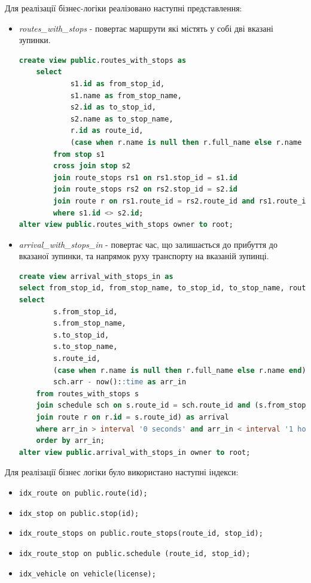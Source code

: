 \documentclass[oneside,14pt]{extarticle}
\begin{document}
Для реалізації бізнес-логіки реалізовано наступні представлення:
\begin{itemize}
\item \textit{routes\_with\_stops} - повертає маршрути які містять у собі дві вказані зупинки.
{\fontsize{8pt}{8pt}\selectfont\begin{lstlisting}[language=sql]
create view public.routes_with_stops as
	select
			s1.id as from_stop_id,
			s1.name as from_stop_name,
			s2.id as to_stop_id,
			s2.name as to_stop_name,
			r.id as route_id,
			(case when r.name is null then r.full_name else r.name end) as route_name
		from stop s1
		cross join stop s2
		join route_stops rs1 on rs1.stop_id = s1.id
		join route_stops rs2 on rs2.stop_id = s2.id
		join route r on rs1.route_id = rs2.route_id and rs1.route_id = r.id
		where s1.id <> s2.id;
alter view public.routes_with_stops owner to root;
\end{lstlisting}}
\item \textit{arrival\_with\_stops\_in} - повертає час, що залишається до прибуття до вказаної зупинки, та напрямок руху транспорту на вказаній зупинці.
{\fontsize{8pt}{8pt}\selectfont\begin{lstlisting}[language=sql]
create view arrival_with_stops_in as
select from_stop_id, from_stop_name, to_stop_id, to_stop_name, route_id, route_name, to_char(arr_in, 'MI:SS') as arr_in from (
select
		s.from_stop_id,
		s.from_stop_name,
		s.to_stop_id,
		s.to_stop_name,
		s.route_id,
		(case when r.name is null then r.full_name else r.name end) as route_name,
		sch.arr - now()::time as arr_in
	from routes_with_stops s
	join schedule sch on s.route_id = sch.route_id and (s.from_stop_id = sch.stop_id or s.to_stop_id = sch.stop_id)
	join route r on r.id = s.route_id) as arrival
	where arr_in > interval '0 seconds' and arr_in < interval '1 hour'
	order by arr_in;
alter view public.arrival_with_stops_in owner to root;
\end{lstlisting}}
\end{itemize}

Для реалізації бізнес логіки було використано наступні індекси:
\begin{itemize}
	\item \texttt{idx\_route on public.route(id);}
	\item \texttt{idx\_stop on public.stop(id);}
	\item \texttt{idx\_route\_stops on public.route\_stops(route\_id, stop\_id);}
	\item \texttt{idx\_route\_stop on public.schedule (route\_id, stop\_id);}
	\item \texttt{idx\_vehicle on vehicle(license);}
\end{itemize}
\end{document}
